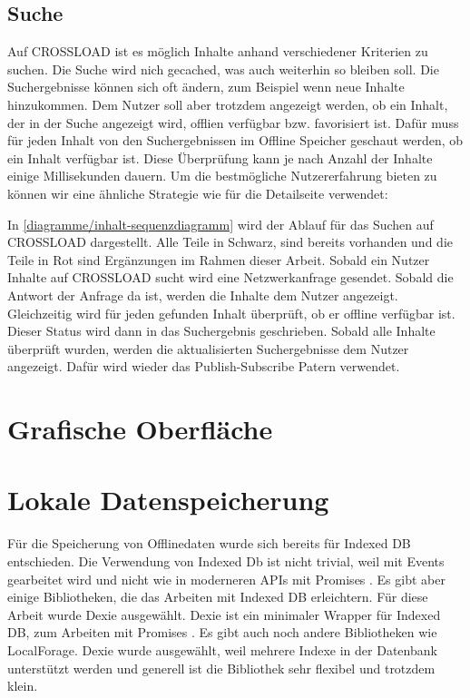 \subsection{Suche}
Auf CROSSLOAD ist es möglich Inhalte anhand verschiedener Kriterien zu suchen. Die Suche wird nich gecached, was auch weiterhin so bleiben soll. Die Suchergebnisse können sich oft ändern, zum Beispiel wenn neue Inhalte hinzukommen. Dem Nutzer soll aber trotzdem angezeigt werden, ob ein Inhalt, der in der Suche angezeigt wird, offlien verfügbar bzw. favorisiert ist. Dafür muss für jeden Inhalt von den Suchergebnissen im Offline Speicher geschaut werden, ob ein Inhalt verfügbar ist. Diese Überprüfung kann je nach Anzahl der Inhalte einige Millisekunden dauern. Um die bestmögliche Nutzererfahrung bieten zu können wir eine ähnliche Strategie wie für die Detailseite verwendet:


In \autoref{diagramme/inhalt-sequenzdiagramm} wird der Ablauf für das Suchen auf CROSSLOAD dargestellt. Alle Teile in Schwarz, sind bereits vorhanden und die Teile in Rot sind Ergänzungen im Rahmen dieser Arbeit. Sobald ein Nutzer Inhalte auf CROSSLOAD sucht wird eine Netzwerkanfrage gesendet. Sobald die Antwort der Anfrage da ist, werden die Inhalte dem Nutzer angezeigt. Gleichzeitig wird für jeden gefunden Inhalt überprüft, ob er offline verfügbar ist. Dieser Status wird dann in das Suchergebnis geschrieben. Sobald alle Inhalte überprüft wurden, werden die aktualisierten Suchergebnisse dem Nutzer angezeigt. Dafür wird wieder das Publish-Subscribe Patern verwendet. 

\section{Grafische Oberfläche}

\section{Lokale Datenspeicherung}
\label{Kap5:Speicherung}
Für die Speicherung von Offlinedaten wurde sich bereits für Indexed DB entschieden. Die Verwendung von Indexed Db ist nicht trivial, weil mit Events gearbeitet wird und nicht wie in moderneren APIs mit Promises \autocite{mdn-indexeddb}. Es gibt aber einige Bibliotheken, die das Arbeiten mit Indexed DB erleichtern. Für diese Arbeit wurde Dexie ausgewählt. Dexie ist ein minimaler Wrapper für Indexed DB, zum Arbeiten mit Promises \autocite{dexie}. Es gibt auch noch andere Bibliotheken wie LocalForage. Dexie wurde ausgewählt, weil mehrere Indexe in der Datenbank unterstützt werden und generell ist die Bibliothek sehr flexibel und trotzdem klein.

